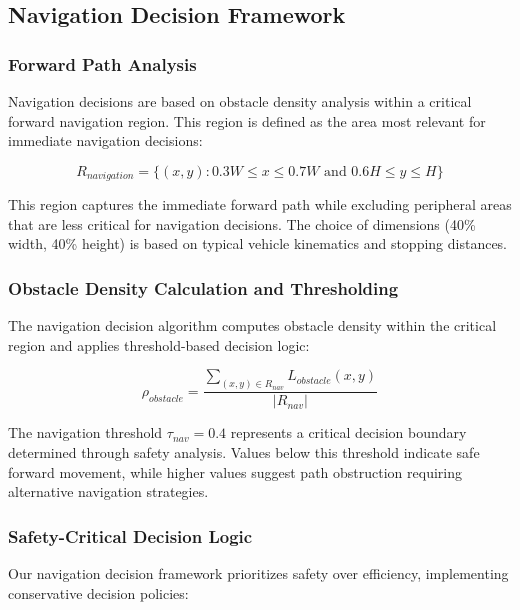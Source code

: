 \documentclass[10pt]{article}
\begin{document}
\subsection{Navigation Decision Framework}

\subsubsection{Forward Path Analysis}

Navigation decisions are based on obstacle density analysis within a critical forward navigation region. This region is defined as the area most relevant for immediate navigation decisions:

\begin{equation}
R_{navigation} = \{(x,y) : 0.3W \leq x \leq 0.7W \text{ and } 0.6H \leq y \leq H\}
\label{eq:navigation_region_detailed}
\end{equation}

This region captures the immediate forward path while excluding peripheral areas that are less critical for navigation decisions. The choice of dimensions (40\% width, 40\% height) is based on typical vehicle kinematics and stopping distances.

\subsubsection{Obstacle Density Calculation and Thresholding}

The navigation decision algorithm computes obstacle density within the critical region and applies threshold-based decision logic:

\begin{equation}
\rho_{obstacle} = \frac{\sum_{(x,y) \in R_{nav}} L_{obstacle}(x,y)}{|R_{nav}|}
\label{eq:obstacle_density_detailed}
\end{equation}

The navigation threshold $\tau_{nav} = 0.4$ represents a critical decision boundary determined through safety analysis. Values below this threshold indicate safe forward movement, while higher values suggest path obstruction requiring alternative navigation strategies.

\subsubsection{Safety-Critical Decision Logic}

Our navigation decision framework prioritizes safety over efficiency, implementing conservative decision policies:
\end{document}
